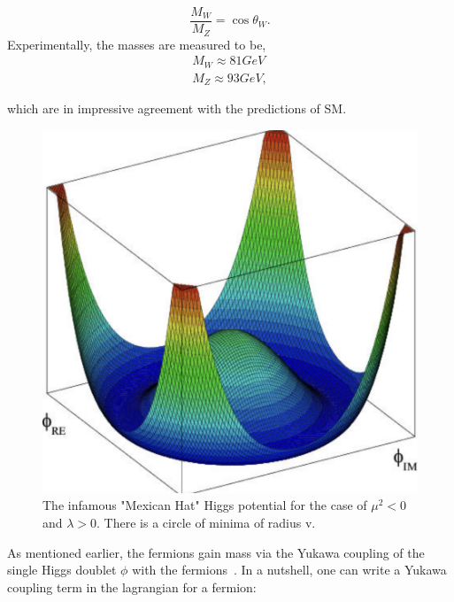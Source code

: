 \begin{equation}
    \frac{M_{W}}{M_{Z}} = \cos\theta_{W}.    
\end{equation}
Experimentally, the masses are measured to be,
\begin{equation}
\begin{align}
    M_W \approx 81 GeV \\
    M_Z \approx 93 GeV,
\end{align}
\end{equation}

which are in impressive agreement with the predictions of SM.


\begin{figure}[!htbp]
	\centering
    \includegraphics[scale=0.5]{fig/MexicanHat.png}
	\caption{The infamous "Mexican Hat" Higgs potential for the case of $\mu^2 <0$ and $\lambda >0$. There is a circle of minima of radius v.}
	\label{fig:MexicanHat}
\end{figure}

As mentioned earlier, the fermions gain mass via the Yukawa coupling of the single Higgs doublet $\phi$ with the fermions~\cite{Nguyen:HiggsMechanism}. In a nutshell, one can write a Yukawa coupling term in the lagrangian for a fermion:

